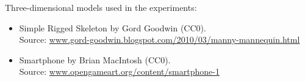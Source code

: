 \begin{appendices}
  Three-dimensional models used in the experiments:
  \begin{itemize}
    \item Simple Rigged Skeleton by Gord Goodwin (CC0).\\Source: \href{http://gord-goodwin.blogspot.com/2010/03/manny-mannequin.html}{www.gord-goodwin.blogspot.com/2010/03/manny-mannequin.html}
    \item Smartphone by Brian MacIntosh (CC0).\\Source: \href{https://opengameart.org/content/smartphone-1}{www.opengameart.org/content/smartphone-1}
  \end{itemize}


  
\end{appendices}